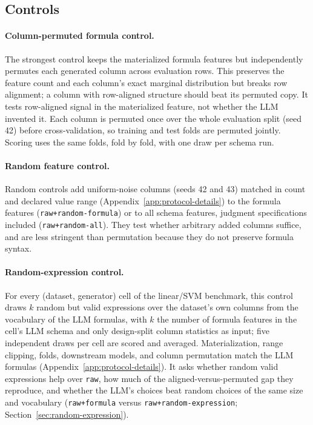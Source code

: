 \subsection{Controls}\label{sec:controls}

\paragraph{Column-permuted formula control.}

The strongest control keeps the materialized formula features but independently permutes each generated column across evaluation rows. This preserves the feature count and each column's exact marginal distribution but breaks row alignment; a column with row-aligned structure should beat its permuted copy. It tests row-aligned signal in the materialized feature, not whether the LLM invented it. Each column is permuted once over the whole evaluation split (seed 42) before cross-validation, so training and test folds are permuted jointly. Scoring uses the same folds, fold by fold, with one draw per schema run.

\paragraph{Random feature control.}

Random controls add uniform-noise columns (seeds 42 and 43) matched in count and declared value range (Appendix~\ref{app:protocol-details}) to the formula features (\texttt{raw+random-formula}) or to all schema features, judgment specifications included (\texttt{raw+random-all}). They test whether arbitrary added columns suffice, and are less stringent than permutation because they do not preserve formula syntax.

\paragraph{Random-expression control.}

For every (dataset, generator) cell of the linear/SVM benchmark, this control draws \(k\) random but valid expressions over the dataset's own columns from the vocabulary of the LLM formulas, with \(k\) the number of formula features in the cell's LLM schema and only design-split column statistics as input; five independent draws per cell are scored and averaged. Materialization, range clipping, folds, downstream models, and column permutation match the LLM formulas (Appendix~\ref{app:protocol-details}). It asks whether random valid expressions help over \texttt{raw}, how much of the aligned-versus-permuted gap they reproduce, and whether the LLM's choices beat random choices of the same size and vocabulary (\texttt{raw+formula} versus \texttt{raw+random-expression}; Section~\ref{sec:random-expression}).

